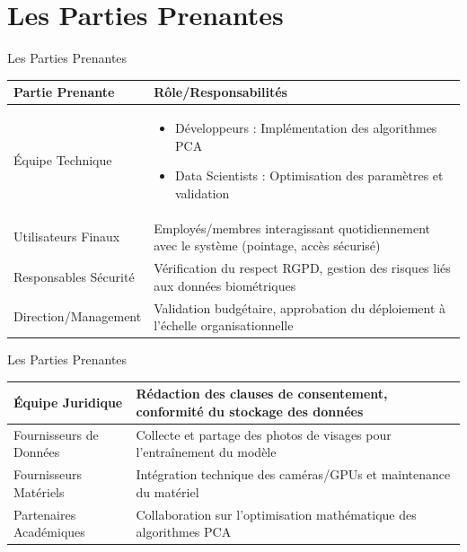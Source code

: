 \documentclass{beamer}
\begin{document}
\section{Les Parties Prenantes}
\begin{frame}{Les Parties Prenantes}

    \begin{center}
    \begin{tabular}{|p{5cm}|p{6cm}|}
    \hline
    \textbf{Partie Prenante} & \textbf{Rôle/Responsabilités} \\
    \hline
    Équipe Technique & 
    \begin{itemize}
        \item Développeurs : Implémentation des algorithmes PCA
        \item Data Scientists : Optimisation des paramètres et validation
    \end{itemize} \\
    \hline
    Utilisateurs Finaux & 
    Employés/membres interagissant quotidiennement avec le système (pointage, accès sécurisé) \\
    \hline
    Responsables Sécurité & 
    Vérification du respect RGPD, gestion des risques liés aux données biométriques \\
    \hline
    Direction/Management & 
    Validation budgétaire, approbation du déploiement à l'échelle organisationnelle \\
    
    \hline
    \end{tabular}
\end{center}
    
\end{frame}

\begin{frame}{Les Parties Prenantes}
    \begin{center}
    \begin{tabular}{|p{5cm}|p{6cm}|}
    \hline
    Équipe Juridique & 
    Rédaction des clauses de consentement, conformité du stockage des données \\
    \hline
    Fournisseurs de Données & 
    Collecte et partage des photos de visages pour l'entraînement du modèle \\
    \hline
    Fournisseurs Matériels & 
    Intégration technique des caméras/GPUs et maintenance du matériel \\
    \hline
    Partenaires Académiques & 
    Collaboration sur l'optimisation mathématique des algorithmes PCA \\
    \hline
    \end{tabular}
\end{center}
    
\end{frame}
\end{document}
